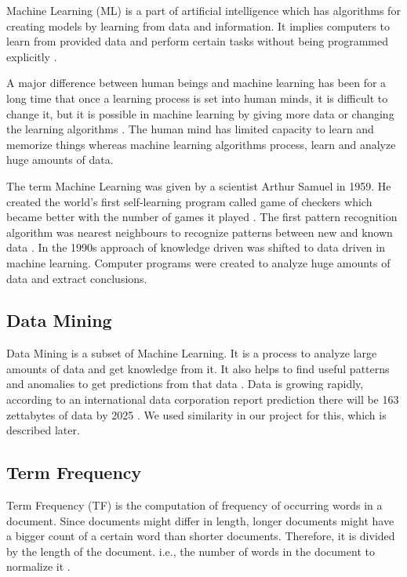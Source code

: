 Machine Learning (ML) is a part of artificial intelligence which has algorithms for creating models by learning from data and information. It implies computers to learn from provided data and perform certain tasks without being programmed explicitly \cite{ml-alpaydin}.

A major difference between human beings and machine learning has been for a long time that once a learning process is set into human minds, it is difficult to change it, but it is possible in machine learning by giving more data or changing the learning algorithms \cite{ml-janardhanan}. The human mind has limited capacity to learn and memorize things whereas machine learning algorithms process, learn and analyze huge amounts of data.

The term Machine Learning was given by a scientist Arthur Samuel in 1959. He created the world's first self-learning program called game of checkers which became better with the number of games it played \cite{ml-samuel}. The first pattern recognition algorithm was nearest neighbours to recognize patterns between new and known data \cite{ml-cover}. In the 1990s approach of knowledge driven was shifted to data driven in machine learning. Computer programs were created to analyze huge amounts of data and extract conclusions.


\subsection{Data Mining}

Data Mining is a subset of Machine Learning. It is a process to analyze large amounts of data and get knowledge from it. It also helps to find useful patterns and anomalies to get predictions from that data \cite{dm-iberdrola}. Data is growing rapidly, according to an international data corporation report prediction there will be 163 zettabytes of data by 2025 \cite{dm-idc}. We used similarity in our project for this, which is described later.

\subsection{Term Frequency}

Term Frequency (TF) is the computation of frequency of occurring words in a document. Since documents might differ in length, longer documents might have a bigger count of a certain word than shorter documents. Therefore, it is divided by the length of the document. i.e., the number of words in the document to normalize it \cite{Salton1983}.

